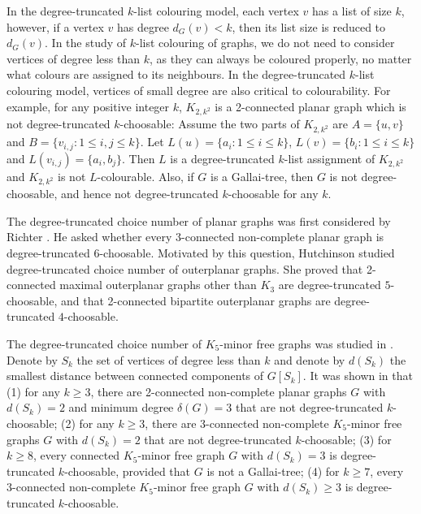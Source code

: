 \documentclass[11pt,a4paper]{article}
\theoremstyle{definition}
\begin{document}
In the degree-truncated $k$-list colouring model, each vertex $v$ has a list of size $k$, however, if a vertex $v$ has degree $d_G(v) < k$, then its list size is reduced to $d_G(v)$. In the study of $k$-list colouring of graphs, we do not need to consider vertices of degree less than $k$, as they can always be coloured properly, no matter what colours are assigned to its neighbours. In the degree-truncated $k$-list colouring model, vertices of small degree are also critical to colourability.  
For example, for any positive integer $k$, $K_{2, k^2}$ is a 2-connected planar graph which is not degree-truncated $k$-choosable: Assume the two parts of $K_{2, k^2}$ are $A=\{u,v\}$ and $B= \{v_{i,j}: 1 \le i, j \le k\}$. Let $L(u)=\{a_i: 1 \le i \le k\}$, $L(v)=\{b_i: 1 \le i \le k\}$ and $L(v_{i,j}) = \{a_i, b_j\}$. Then $L$ is a degree-truncated $k$-list assignment of $K_{2, k^2}$ and $K_{2, k^2}$ is not $L$-colourable.
Also, if $G$ is a Gallai-tree, then $G$ is not degree-choosable, and hence not degree-truncated $k$-choosable for any $k$. 



    The degree-truncated choice number of planar graphs   was first considered by Richter \cite{Hutchinson, SV}. 
    He asked whether every 3-connected non-complete planar graph is degree-truncated 6-choosable. Motivated by this question, Hutchinson \cite{Hutchinson} studied degree-truncated choice number of outerplanar graphs. She proved that 2-connected   maximal outerplanar graphs other than $K_3$ are degree-truncated $5$-choosable, and that 2-connected bipartite outerplanar graphs are degree-truncated $4$-choosable. 

    
    The degree-truncated choice number of $K_5$-minor free graphs was studied in \cite{CPTV}. Denote by $S_k$ the set of vertices of  degree less than $k$ and denote by $d(S_k)$ the smallest distance between connected components of $G[S_k]$. It was shown in \cite{CPTV} that (1) for any $k \ge 3$, there are 2-connected non-complete planar graphs $G$ with $d(S_k) =2$ and minimum degree $\delta(G) =3$ that are not degree-truncated $k$-choosable; (2) for any $k \ge 3$, there are 3-connected non-complete 
 $K_5$-minor free graphs $G$ with $d(S_k) =2$  that are not degree-truncated $k$-choosable; (3)  for $k \ge 8$, every connected $K_5$-minor free graph $G$ with $d(S_k)=3$ is degree-truncated $k$-choosable, provided that $G$ is not a Gallai-tree; (4) for $k \ge 7$, every 3-connected non-complete $K_5$-minor free graph $G$ with $d(S_k) \ge 3$ is degree-truncated $k$-choosable.  
\end{document}

